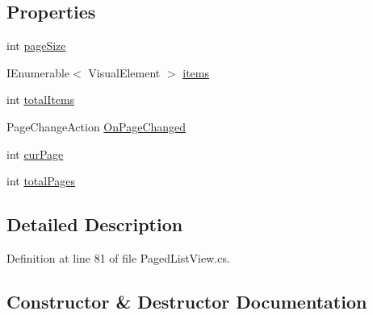 \subsection*{Properties}
\begin{DoxyCompactItemize}
\item 
int \mbox{\hyperlink{class_unity_editor_1_1_collaboration_1_1_paged_list_view_ac067f3e60ebc992ade20c6ea09992bc7}{page\+Size}}
\item 
I\+Enumerable$<$ Visual\+Element $>$ \mbox{\hyperlink{class_unity_editor_1_1_collaboration_1_1_paged_list_view_a6b1da183409fed3c9a44e884a4ff3393}{items}}
\item 
int \mbox{\hyperlink{class_unity_editor_1_1_collaboration_1_1_paged_list_view_a7d46fb1e4bb240bafed65a39b6f59182}{total\+Items}}
\item 
Page\+Change\+Action \mbox{\hyperlink{class_unity_editor_1_1_collaboration_1_1_paged_list_view_a67516b5c5a8d125fa49b4aa8f3a10c1f}{On\+Page\+Changed}}
\item 
int \mbox{\hyperlink{class_unity_editor_1_1_collaboration_1_1_paged_list_view_a258e713600f809cf7ef587e9f509b0fa}{cur\+Page}}
\item 
int \mbox{\hyperlink{class_unity_editor_1_1_collaboration_1_1_paged_list_view_abaa492b7e20d2b0ba8777c62590a2b7f}{total\+Pages}}
\end{DoxyCompactItemize}


\subsection{Detailed Description}


Definition at line 81 of file Paged\+List\+View.\+cs.



\subsection{Constructor \& Destructor Documentation}
\mbox{\label{class_unity_editor_1_1_collaboration_1_1_paged_list_view_a2b066f74e6330559c44d26dbbb44060e}} 
